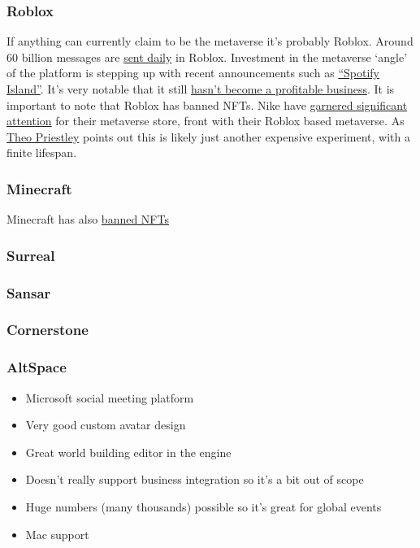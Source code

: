 \subsubsection{Roblox}
If anything can currently claim to be the metaverse it's probably Roblox. Around 60 billion messages are \href{https://podcasts.apple.com/us/podcast/developments-investments-experiences-in-the-metaverse/id1593908027?i=1000540906629}{sent daily} in Roblox. Investment in the metaverse `angle' of the platform is stepping up with recent announcements such as \href{https://techcrunch.com/2022/05/03/spotify-becomes-first-music-streamer-to-launch-on-roblox/?}{``Spotify Island''}. It's very notable that it still \href{https://fortune.com/2022/06/03/roblox-gaming-ecosystem-metaverse-stocks-profit/}{hasn't become a profitable business}. It is important to note that Roblox has banned NFTs. Nike have \href{https://www.thedrum.com/news/2022/09/22/21m-people-have-now-visited-nike-s-roblox-store-here-s-how-do-metaverse-commerce}{garnered significant attention} for their metaverse store, front with their Roblox based metaverse. As \href{https://medium.com/@theo/why-nikeland-is-not-the-metaverse-success-story-you-think-it-is-46742dc2f231}{Theo Priestley} points out this is likely just another expensive experiment, with a finite lifespan.

\subsubsection{Minecraft}
Minecraft has also \href{https://www.minecraft.net/en-us/article/minecraft-and-nfts}{banned NFTs}
\subsubsection{Surreal}
\subsubsection{Sansar}
\subsubsection{Cornerstone}
\subsubsection{AltSpace}
\begin{itemize}
\item Microsoft social meeting platform
\item Very good custom avatar design
\item Great world building editor in the engine
\item Doesn't really support business integration so it's a bit out of scope
\item Huge numbers (many thousands) possible so it's great for global events
\item Mac support
\end{itemize}
